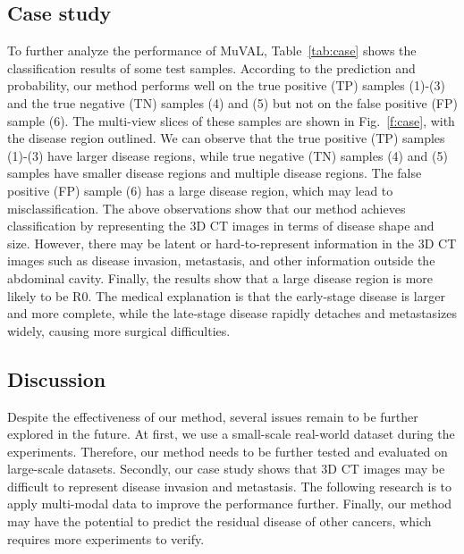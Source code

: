 \subsection{Case study}
To further analyze the performance of MuVAL, Table~\ref{tab:case} shows the classification results of some test samples. 
According to the prediction and probability, our method performs well on the true positive (TP) samples (1)-(3) and the true negative (TN) samples (4) and (5) but not on the false positive (FP) sample (6).
The multi-view slices of these samples are shown in Fig.~\ref{f:case}, with the disease region outlined. We can observe that the true positive (TP) samples (1)-(3) have larger disease regions, while true negative (TN) samples (4) and (5) samples have smaller disease regions and multiple disease regions. 
The false positive (FP) sample (6) has a large disease region,  which may lead to misclassification. 
The above observations show that our method achieves classification by representing the 3D CT images in terms of disease shape and size. 
However, there may be latent or hard-to-represent information in the 3D CT images such as disease invasion, metastasis, and other information outside the abdominal cavity.
Finally, the results show that a large disease region is more likely to be R0.
The medical explanation \cite{horvath2013relationship} is that the early-stage disease is larger and more complete, while the late-stage disease rapidly detaches and metastasizes widely, causing more surgical difficulties.

\subsection{Discussion}
Despite the effectiveness of our method, several issues remain to be further explored in the future. 
At first, we use a small-scale real-world dataset during the experiments.
Therefore, our method needs to be further tested and evaluated on large-scale datasets. 
Secondly, our case study shows that 3D CT images may be difficult to represent disease invasion and metastasis.
The following research is to apply multi-modal data to improve the performance further. 
Finally, our method may have the potential to predict the residual disease of other cancers, which requires more experiments to verify.